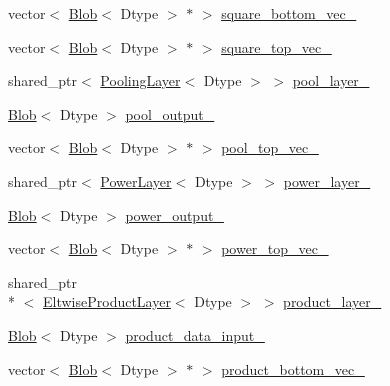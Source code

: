 \begin{DoxyCompactItemize}
\item 
vector$<$ \hyperlink{classcaffe_1_1_blob}{Blob}$<$ Dtype $>$ $\ast$ $>$ \hyperlink{classcaffe_1_1_l_r_n_layer_a0361883b2eada25a56b5a90f5ff99cac}{square\+\_\+bottom\+\_\+vec\+\_\+}
\item 
vector$<$ \hyperlink{classcaffe_1_1_blob}{Blob}$<$ Dtype $>$ $\ast$ $>$ \hyperlink{classcaffe_1_1_l_r_n_layer_accfb1597e6045b09dcdb421ba7e92070}{square\+\_\+top\+\_\+vec\+\_\+}
\item 
shared\+\_\+ptr$<$ \hyperlink{classcaffe_1_1_pooling_layer}{Pooling\+Layer}$<$ Dtype $>$ $>$ \hyperlink{classcaffe_1_1_l_r_n_layer_a3d883b2d7022bd66e1ac2227400a1caa}{pool\+\_\+layer\+\_\+}
\item 
\hyperlink{classcaffe_1_1_blob}{Blob}$<$ Dtype $>$ \hyperlink{classcaffe_1_1_l_r_n_layer_a7dfcd31ed9694bdd48c9e80bdfe1e7a4}{pool\+\_\+output\+\_\+}
\item 
vector$<$ \hyperlink{classcaffe_1_1_blob}{Blob}$<$ Dtype $>$ $\ast$ $>$ \hyperlink{classcaffe_1_1_l_r_n_layer_af1d75143e7d103749575c3ee167e1c8d}{pool\+\_\+top\+\_\+vec\+\_\+}
\item 
shared\+\_\+ptr$<$ \hyperlink{classcaffe_1_1_power_layer}{Power\+Layer}$<$ Dtype $>$ $>$ \hyperlink{classcaffe_1_1_l_r_n_layer_a7d9446e995a4e4d1c27961159c1e7950}{power\+\_\+layer\+\_\+}
\item 
\hyperlink{classcaffe_1_1_blob}{Blob}$<$ Dtype $>$ \hyperlink{classcaffe_1_1_l_r_n_layer_adb51a5bb10b26a27835b2b19ecfe72b2}{power\+\_\+output\+\_\+}
\item 
vector$<$ \hyperlink{classcaffe_1_1_blob}{Blob}$<$ Dtype $>$ $\ast$ $>$ \hyperlink{classcaffe_1_1_l_r_n_layer_ac83227b50de568833235e7b2bdfbb8a8}{power\+\_\+top\+\_\+vec\+\_\+}
\item 
shared\+\_\+ptr\\*
$<$ \hyperlink{classcaffe_1_1_eltwise_product_layer}{Eltwise\+Product\+Layer}$<$ Dtype $>$ $>$ \hyperlink{classcaffe_1_1_l_r_n_layer_aa1b9baeea7f76ad06ec122ce279aeaeb}{product\+\_\+layer\+\_\+}
\item 
\hyperlink{classcaffe_1_1_blob}{Blob}$<$ Dtype $>$ \hyperlink{classcaffe_1_1_l_r_n_layer_ada65115660edfedc23fce996acc42c74}{product\+\_\+data\+\_\+input\+\_\+}
\item 
vector$<$ \hyperlink{classcaffe_1_1_blob}{Blob}$<$ Dtype $>$ $\ast$ $>$ \hyperlink{classcaffe_1_1_l_r_n_layer_ab1bf581b7cf42b36bdbad8333989a177}{product\+\_\+bottom\+\_\+vec\+\_\+}
\end{DoxyCompactItemize}


